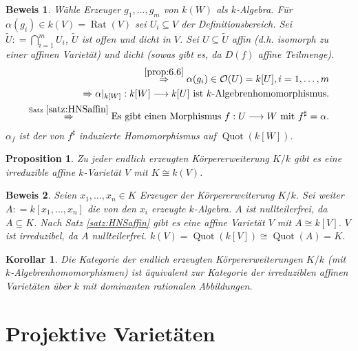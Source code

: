 \documentclass[a4paper,12pt]{report}
\theoremstyle{break}
\newtheorem{Prop}[Def]{Proposition}
\newtheorem{Kor}[Def]{Korollar}
\theoremstyle{nonumberbreak}
\theoremstyle{nonumberplain}
\newtheorem{Bew}{Beweis}
\newcommand{\defeqr}[0]{\mathrel{\mathop:}=}
\DeclareMathOperator{\Quot}{Quot}
\DeclareMathOperator{\Rat}{Rat}
\begin{document}
\begin{Bew}
  Wähle Erzeuger $g_1,\dots,g_m$ von $k(W)$ als $k$-Algebra. Für $\alpha(g_i)\in k(V)=\Rat(V)$ sei
  $U_i\subseteq V$ der Definitionsbereich. Sei $\tilde{U}\defeqr\bigcap_{i=1}^m U_i$, $\tilde{U}$ ist offen und dicht in $V$.
Sei $U\subseteq\tilde{U}$ affin (d.h. isomorph zu einer affinen Varietät) und dicht (sowas gibt es, da $D(f)$ affine Teilmenge).
\begin{align*}
\stackrel{\ref{prop:6.6}}{\Rightarrow} \alpha(g_i)\in\mathcal O(U)=k[U], i=1,\dots,m \\
  \Rightarrow \alpha|_{k[W]}:k[W]\longrightarrow k[U] \text{ ist $k$-Algebrenhomomorphismus.} \\
\stackrel{\textrm{Satz } \ref{satz:HNSaffin}}{\Rightarrow} \text{Es gibt einen Morphismus $f:U\longrightarrow W$ mit $f^\sharp=\alpha$.}
\end{align*}
$\alpha_f$ ist der von $f^\sharp$ induzierte Homomorphismus auf $\Quot(k[W])$.
\end{Bew}
\begin{Prop}
  \label{prop:7.4}
Zu jeder endlich erzeugten Körpererweiterung $K/k$ gibt es eine irreduzible affine $k$-Varietät $V$ mit $K\cong k(V)$.
\end{Prop}
\begin{Bew}
  Seien $x_1,\dots,x_n\in K$ Erzeuger der Körpererweiterung $K/k$. Sei weiter $A\defeqr k[x_1,\dots,x_n]$ die von
den $x_i$ erzeugte $k$-Algebra. $A$ ist nullteilerfrei, da $A\subseteq K$. Nach Satz \ref{satz:HNSaffin} gibt es eine 
affine Varietät $V$ mit $A\cong k[V]$. $V$ ist irreduzibel, da $A$ nullteilerfrei. $k(V)=\Quot(k[V])\cong\Quot(A)=K$.
\end{Bew}
\begin{Kor}
  \label{kor:7.5}
Die Kategorie der endlich erzeugten Körpererweiterungen $K/k$ (mit $k$-Algebren\-homo\-mor\-phis\-men)
ist äquivalent zur Kategorie der irreduziblen affinen Varietäten über $k$ mit dominanten rationalen Abbildungen.
\end{Kor}



\chapter{Projektive Varietäten}
\setcounter{section}{7}
\end{document}
